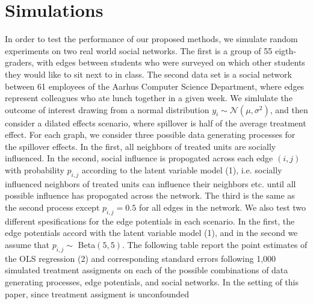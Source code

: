 \documentclass{article}
\begin{document}
\section{Simulations}

In order to test the performance of our proposed methods, we simulate random experiments on two real world social networks. The first is a group of 55 eigth-graders, with edges between 
students who were surveyed on which other students they would like to sit next to in class. The second data set is a social network between 61 employees of the Aarhus Computer Science Department, where 
edges represent colleagues who ate lunch together in a given week. We simlulate the outcome of interest drawing from a normal distribution $y_{i} \sim \mathcal{N}(\mu, \sigma^2)$, and then consider a dilated effects scenario, 
where spillover is half of the average treatment effect. For each graph, we consider three possible data generating processes for the spillover effects. In the first, all neighbors of treated units are socially influenced. 
In the second, social influence is propogated across each edge $(i, j)$ with probability $p_{i,j}$ according to the latent variable model (1), i.e. socially influenced neighbors of treated units can influence their neighbors etc. until all possible influence
has propogated across the network. The third is the same as the second process except $p_{i,j} = 0.5$ for all edges in the network. We also test two different spesifications for the edge potentials in each scenario. In the first, the edge potentials accord with the latent variable model (1), and in the second we assume that $p_{i,j} \sim$ Beta$(5, 5)$. The following table report the point estimates of the OLS regression (2) and corresponding standard errors following 1,000 simulated 
treatment assigments on each of the possible combinations of data generating processes, edge potentials, and social networks. In the setting of this paper, since treatment assigment is unconfounded 
\end{document}
